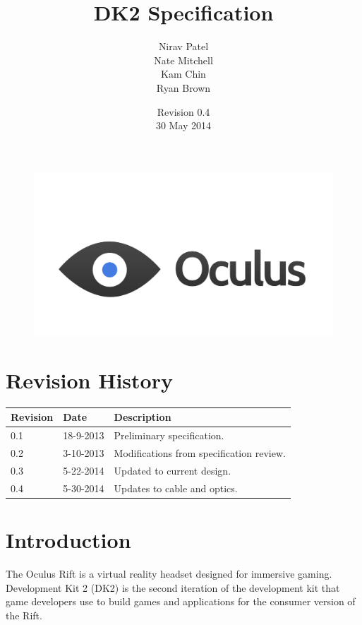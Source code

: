 \documentclass[letterpaper]{article}
\title{\huge DK2 Specification}
\author{Nirav Patel\\ Nate Mitchell\\ Kam Chin\\ Ryan Brown}
\date{Revision 0.4\\
30 May 2014}
\begin{document}
\begin{figure}
\includegraphics[width=5in]{Figures/OculusLogo.png}
\end{figure}

\maketitle
\thispagestyle{empty}

\cfoot{}
\rfoot{\thepage}

\newpage

\tableofcontents

\newpage

\section{Revision History}

\begin{center}
    \begin{tabular}{ | l | l | p{8cm} |}
    \hline
    \cellcolor{lightgray} Revision & \cellcolor{lightgray} Date & \cellcolor{lightgray} Description \\ \hline
    0.1 & 18-9-2013 & Preliminary specification. \\ \hline
    0.2 & 3-10-2013 & Modifications from specification review. \\ \hline
    0.3 & 5-22-2014 & Updated to current design. \\ \hline
    0.4 & 5-30-2014 & Updates to cable and optics. \\ \hline
    \end{tabular}
\end{center}

\newpage

\section{Introduction}
The Oculus Rift is a virtual reality headset designed for immersive gaming. Development Kit 2 (DK2) is the second iteration of the development kit that game developers use to build games and applications for the consumer version of the Rift. \\
\end{document}
